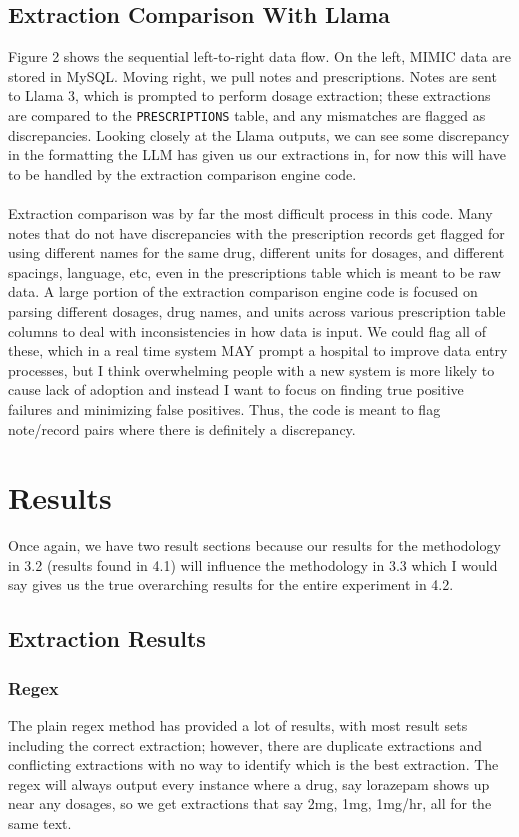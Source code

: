 \documentclass[sigconf,nonacm]{acmart} %
\begin{document}
\subsection{Extraction Comparison With Llama}
Figure 2 shows the sequential left-to-right data flow. On the left, MIMIC data are stored in MySQL. Moving right, we pull notes and prescriptions. Notes are sent to Llama 3, which is prompted to perform dosage extraction; these extractions are compared to the \texttt{PRESCRIPTIONS} table, and any mismatches are flagged as discrepancies. Looking closely at the Llama outputs, we can see some discrepancy in the formatting the LLM has given us our extractions in, for now this will have to be handled by the extraction comparison engine code.
\\\\Extraction comparison was by far the most difficult process in this code. Many notes that do not have discrepancies with the prescription records get flagged for using different names for the same drug, different units for dosages, and different spacings, language, etc, even in the prescriptions table which is meant to be raw data. A large portion of the extraction comparison engine code is focused on parsing different dosages, drug names, and units across various prescription table columns to deal with inconsistencies in how data is input. We could flag all of these, which in a real time system MAY prompt a hospital to improve data entry processes, but I think overwhelming people with a new system is more likely to cause lack of adoption and instead I want to focus on finding true positive failures and minimizing false positives. Thus, the code is meant to flag note/record pairs where there is definitely a discrepancy.

\section{Results}
Once again, we have two result sections because our results for the methodology in 3.2 (results found in 4.1) will influence the methodology in 3.3 which I would say gives us the true overarching results for the entire experiment in 4.2. 

\subsection{Extraction Results}

\subsubsection{Regex}
The plain regex method has provided a lot of results, with most result sets including the correct extraction; however, there are duplicate extractions and conflicting extractions with no way to identify which is the best extraction. The regex will always output every instance where a drug, say lorazepam shows up near any dosages, so we get extractions that say 2mg, 1mg, 1mg/hr, all for the same text.
\end{document}
